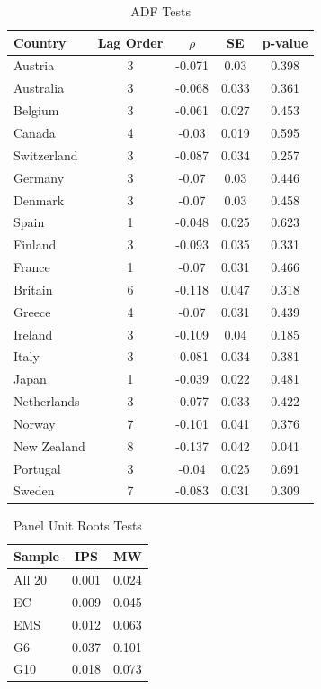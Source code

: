 \documentclass[]{article}
\begin{document}
\begin{table}

\caption{\label{tab:adf}ADF Tests}
\centering
\begin{tabular}[t]{lcccc}
\toprule
Country & Lag Order & $\rho$ & SE & p-value\\
\midrule
Austria & 3 & -0.071 & 0.03 & 0.398\\
Australia & 3 & -0.068 & 0.033 & 0.361\\
Belgium & 3 & -0.061 & 0.027 & 0.453\\
Canada & 4 & -0.03 & 0.019 & 0.595\\
Switzerland & 3 & -0.087 & 0.034 & 0.257\\
Germany & 3 & -0.07 & 0.03 & 0.446\\
Denmark & 3 & -0.07 & 0.03 & 0.458\\
Spain & 1 & -0.048 & 0.025 & 0.623\\
Finland & 3 & -0.093 & 0.035 & 0.331\\
France & 1 & -0.07 & 0.031 & 0.466\\
Britain & 6 & -0.118 & 0.047 & 0.318\\
Greece & 4 & -0.07 & 0.031 & 0.439\\
Ireland & 3 & -0.109 & 0.04 & 0.185\\
Italy & 3 & -0.081 & 0.034 & 0.381\\
Japan & 1 & -0.039 & 0.022 & 0.481\\
Netherlands & 3 & -0.077 & 0.033 & 0.422\\
Norway & 7 & -0.101 & 0.041 & 0.376\\
New Zealand & 8 & -0.137 & 0.042 & 0.041\\
Portugal & 3 & -0.04 & 0.025 & 0.691\\
Sweden & 7 & -0.083 & 0.031 & 0.309\\
\bottomrule
\end{tabular}
\end{table}

\begin{table}

\caption{\label{tab:purt}Panel Unit Roots Tests}
\centering
\begin{tabular}[t]{lcc}
\toprule
Sample & IPS & MW\\
\midrule
All 20 & 0.001 & 0.024\\
EC & 0.009 & 0.045\\
EMS & 0.012 & 0.063\\
G6 & 0.037 & 0.101\\
G10 & 0.018 & 0.073\\
\bottomrule
\end{tabular}
\end{table}
\end{document}
